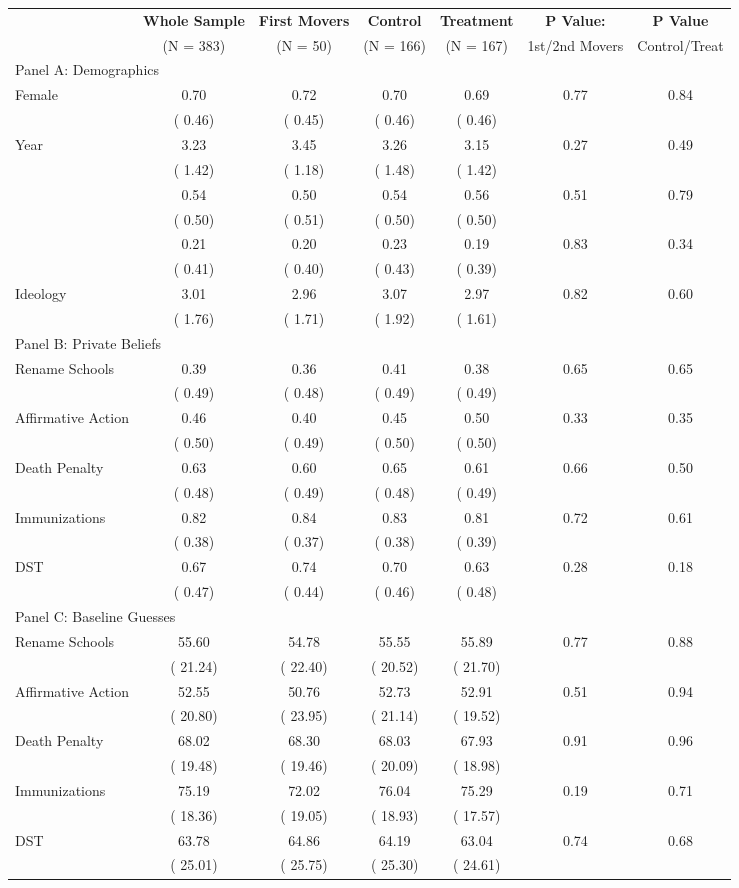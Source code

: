 \begin{tabular}{l*{6}c}\toprule & \textbf{Whole Sample} & \textbf{First Movers} & \textbf{Control}  & \textbf{Treatment} & \textbf{P Value: } & \textbf{P Value} \\ & (N = 383) & (N = 50) & (N = 166)  & (N = 167) &  1st/2nd Movers & Control/Treat \\\midrule \multicolumn{7}{l}{Panel A: Demographics} \\\midrule Female&    0.70&    0.72&    0.70&    0.69&    0.77&    0.84\\&(    0.46)&(    0.45)&(    0.46)&(    0.46)&&\\Year&    3.23&    3.45&    3.26&    3.15&    0.27&    0.49\\&(    1.42)&(    1.18)&(    1.48)&(    1.42)&&\\&    0.54&    0.50&    0.54&    0.56&    0.51&    0.79\\&(    0.50)&(    0.51)&(    0.50)&(    0.50)&&\\&    0.21&    0.20&    0.23&    0.19&    0.83&    0.34\\&(    0.41)&(    0.40)&(    0.43)&(    0.39)&&\\Ideology&    3.01&    2.96&    3.07&    2.97&    0.82&    0.60\\&(    1.76)&(    1.71)&(    1.92)&(    1.61)&&\\\midrule \multicolumn{7}{l}{Panel B: Private Beliefs} \\\midrule Rename Schools&    0.39&    0.36&    0.41&    0.38&    0.65&    0.65\\&(    0.49)&(    0.48)&(    0.49)&(    0.49)&&\\Affirmative Action&    0.46&    0.40&    0.45&    0.50&    0.33&    0.35\\&(    0.50)&(    0.49)&(    0.50)&(    0.50)&&\\Death Penalty&    0.63&    0.60&    0.65&    0.61&    0.66&    0.50\\&(    0.48)&(    0.49)&(    0.48)&(    0.49)&&\\Immunizations&    0.82&    0.84&    0.83&    0.81&    0.72&    0.61\\&(    0.38)&(    0.37)&(    0.38)&(    0.39)&&\\DST&    0.67&    0.74&    0.70&    0.63&    0.28&    0.18\\&(    0.47)&(    0.44)&(    0.46)&(    0.48)&&\\\midrule \multicolumn{7}{l}{Panel C: Baseline Guesses} \\\midrule Rename Schools&   55.60&   54.78&   55.55&   55.89&    0.77&    0.88\\&(   21.24)&(   22.40)&(   20.52)&(   21.70)&&\\Affirmative Action&   52.55&   50.76&   52.73&   52.91&    0.51&    0.94\\&(   20.80)&(   23.95)&(   21.14)&(   19.52)&&\\Death Penalty&   68.02&   68.30&   68.03&   67.93&    0.91&    0.96\\&(   19.48)&(   19.46)&(   20.09)&(   18.98)&&\\Immunizations&   75.19&   72.02&   76.04&   75.29&    0.19&    0.71\\&(   18.36)&(   19.05)&(   18.93)&(   17.57)&&\\DST&   63.78&   64.86&   64.19&   63.04&    0.74&    0.68\\&(   25.01)&(   25.75)&(   25.30)&(   24.61)&&\\\bottomrule \end{tabular} 